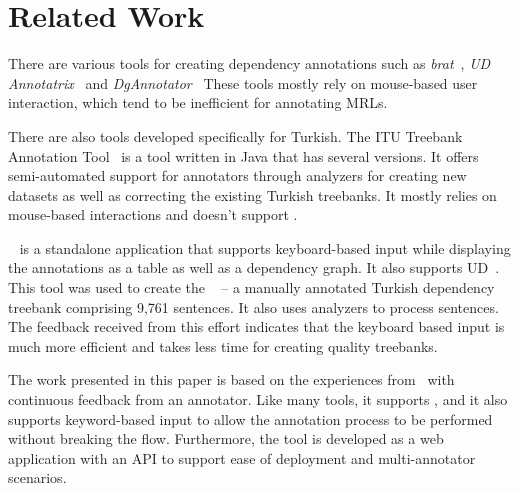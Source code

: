 \section{Related Work}
\label{sec:related}

There are various tools for creating dependency annotations such as \textit{brat}~\cite{brat}, \textit{UD Annotatrix}~\cite{tyers-etal:2018} and \textit{DgAnnotator}~\cite{dgannotator}
These tools mostly rely on mouse-based user interaction, which tend to be inefficient for annotating MRLs.

There are also tools developed specifically for Turkish.
The ITU Treebank Annotation Tool~\cite{pamay-etal-2015-annotation} is a tool written in Java that has several versions.
It offers semi-automated support for annotators through analyzers for creating new datasets as well as correcting the existing Turkish treebanks.
It mostly relies on mouse-based interactions and doesn't support \ud. 

\boatvone~\cite{turk-etal-2019-turkish} is a standalone application that supports keyboard-based input while displaying the annotations as a table as well as a dependency graph.
It also supports UD~\cite{UD}. 
This tool was used to create the \bountreebank~\cite{trk2020resources,UD-Boun-Treebank} -- a manually annotated Turkish dependency treebank comprising 9,761 sentences. It also uses analyzers to process sentences. 
The feedback received from this effort indicates that the keyboard based input is much more efficient and takes less time for creating quality treebanks.

The work presented in this paper is based on the experiences from \boatvone\ with continuous feedback from an annotator. 
Like many tools, it supports \ud, and it also supports keyword-based input to allow the annotation process to be performed without breaking the flow. 
Furthermore, the tool is developed as a web application with an API to support ease of deployment and multi-annotator scenarios. 
